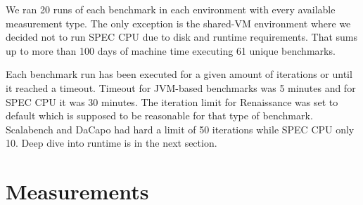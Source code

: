 \begin{table}[ht]
  \centering
  \caption{Summary of selected platforms.}
  \label{table:envs}
\end{table}

We ran 20 runs of each benchmark in each environment with every available measurement type.
The only exception is the \mbox{shared-VM} environment where we decided not to run SPEC CPU due to disk and runtime requirements.
That sums up to more than 100 days of machine time executing 61 unique benchmarks.

Each benchmark run has been executed for a given amount of iterations or until it reached a timeout.
Timeout for \mbox{JVM-based} benchmarks was 5 minutes and for SPEC CPU it was 30 minutes.
The iteration limit for Renaissance was set to default which is supposed to be reasonable for that type of benchmark.
Scalabench and DaCapo had hard a limit of 50 iterations while SPEC CPU only 10.
Deep dive into runtime is in the next section.

\section{Measurements}
\label{sec:measurements}

